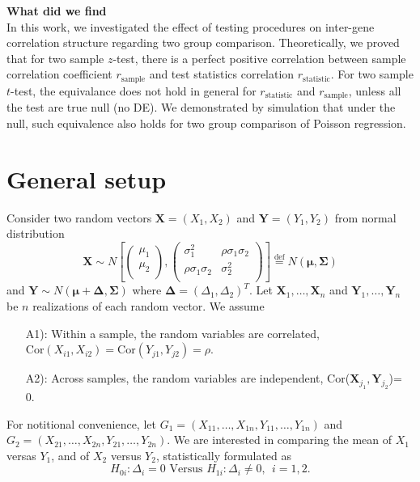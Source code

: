 \documentclass[11pt, a4paper]{article}
\begin{document}
\textbf{What did we find}\\
In this work, we investigated the effect of testing procedures on inter-gene correlation structure regarding two group comparison. Theoretically, we proved that for two sample $z$-test, there is a perfect positive correlation between sample correlation coefficient $r_{\text{sample}}$ and test statistics correlation $r_{\text{statistic}}$. For two sample $t$-test, the equivalance does not hold in general for $r_{\text{statistic}}$ and $r_{\text{sample}}$, unless all the test are true null (no DE).  We demonstrated by simulation that under the null, such equivalence also holds for two group comparison of Poisson regression. 







\section{General setup}
Consider two random vectors $\bm X = (X_1, X_2)$ and $\bm Y =  (Y_1, Y_2)$ from normal distribution
	\[ \bm X 
	\sim N\left[
	\left(\begin{array}{c}
	\mu_1\\
	\mu_2\\
	\end{array} \right), 
	\left(
	\begin{array}{cc}
	\sigma_1^2 &\rho \sigma_1\sigma_2 \\
	\rho \sigma_1 \sigma_2 & 	\sigma_2^2 \\
	\end{array}
	\right)
	\right]  \stackrel{\text{def}}{=} N(\bm \mu, \bm \Sigma)
	\] 
	 and $\bm Y \sim N(\bm \mu + \bm \Delta, \bm \Sigma)$ where $\bm \Delta = (\Delta_1, \Delta_2)^T$. Let $\bm X_1, \ldots, \bm X_n$ and $\bm Y_1, \ldots, \bm Y_n$ be $n$ realizations of each random vector. We assume
\begin{enumerate}
	\item[A1):] Within a sample, the random variables are correlated, $\text{Cor}(X_{i1}, X_{i2}) = \text{Cor}(Y_{j1}, Y_{j2}) = \rho$. 
	\item[A2):] Across samples, the random variables are independent, Cor($\bm X_{j_1}, \bm Y_{j_2}$)= 0. 
\end{enumerate} 

For notitional convenience, let $G_1 = (X_{11}, \ldots, X_{1n}, Y_{11}, \ldots, Y_{1n})$ and $G_2 =  (X_{21}, \ldots, X_{2n}, Y_{21}, \ldots, Y_{2n})$. We are interested in comparing the mean of $X_1$ versas $Y_1$, and of $X_2$ versus $Y_2$, statistically formulated as \begin{equation}\label{hypotheses}
	H_{0i}:  \Delta_i = 0 \text{     Versus   }  H_{1i}: \Delta_i\neq 0 ,  ~~ i = 1, 2.
\end{equation}
\end{document}
